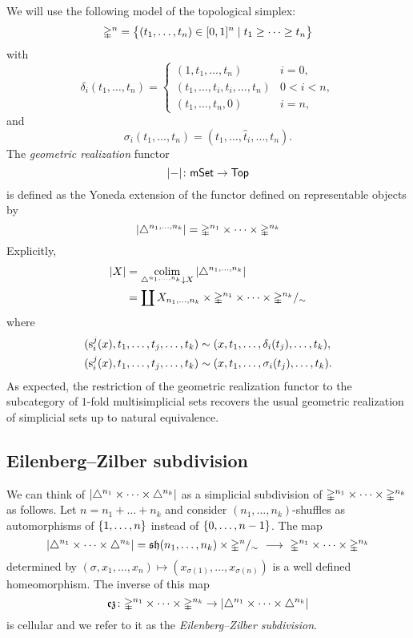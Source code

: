 We will use the following model of the topological simplex:
\[
\mathbb{\Delta}^n = \big\{
(t_1, \dots, t_n) \in [0,1]^n \mid t_1 \geq \dots \geq t_n
\big\}
\]
with
\[
\delta_i(t_1, \dots, t_n) =
\begin{cases}
	(1, t_1, \dots, t_n) & i = 0, \\
	(t_1, \dots, t_i, t_i, \dots, t_n) & 0 < i < n, \\
	(t_1, \dots, t_n, 0) & i = n,
\end{cases}
\]
and
\[
\sigma_i(t_1, \dots, t_n) = (t_1, \dots, \widehat t_i, \dots, t_n).
\]
The \textit{geometric realization} functor
\[
\lvert-\rvert \colon \mathsf{mSet} \to \mathsf{Top}
\]
is defined as the Yoneda extension of the functor defined on representable objects by
\[
\lvert\triangle^{n_1, \dots, n_k}\rvert =
\mathbb{\Delta}^{n_1} \times \dots \times \mathbb{\Delta}^{n_k}
\]
Explicitly,
\begin{align*}
	\bars{X} &=
	\colim_{\cramped{\simplex^{n_1, \dots, n_k} \downarrow X}} \, \bars{\simplex^{n_1, \dots, n_k}} \\ &=
	\coprod X_{n_1,\dots,n_k} \times \gsimplex^{n_1} \times \dots \times \gsimplex^{n_k} /_\sim
\end{align*}
where
\[
\begin{split}
(\operatorname{s}_i^j(x), t_1, \dots, t_j, \dots, t_k) &\sim (x, t_1, \dots, \delta_i(t_j), \dots, t_k), \\
(\operatorname{s}^j_i(x), t_1, \dots, t_j, \dots, t_k) &\sim (x, t_1, \dots, \sigma_i(t_j), \dots, t_k).
\end{split}
\]
As expected, the restriction of the geometric realization functor to the subcategory of $1$-fold multisimplicial sets recovers the usual geometric realization of simplicial sets up to natural equivalence.

\subsection{Eilenberg--Zilber subdivision}

We can think of $\lvert\triangle^{n_1} \times \dots \times \triangle^{n_k}\rvert$ as a simplicial subdivision of $\mathbb{\Delta}^{n_1} \times \dots \times \mathbb{\Delta}^{n_k}$ as follows.
Let $n = n_1 + \dots + n_k$ and consider $(n_1, \dots, n_k)$-shuffles as automorphisms of $\{1, \dots, n\}$ instead of $\{0, \dots, n-1\}$.
The map
\[
\lvert\triangle^{n_1} \times \dots \times \triangle^{n_k}\rvert =
\operatorname{\mathfrak{sh}}(n_1, \dots, n_k) \times \mathbb{\Delta}^n /_\sim \ \longrightarrow \
\mathbb{\Delta}^{n_1} \times \dots \times \mathbb{\Delta}^{n_k}
\]
determined by $(\sigma, x_1, \dots, x_n) \mapsto (x_{\sigma(1)}, \dots, x_{\sigma(n)})$ is a well defined homeomorphism.
The inverse of this map
\[
\operatorname{\mathfrak{ez}} \colon
\mathbb{\Delta}^{n_1} \times \dots \times \mathbb{\Delta}^{n_k} \to
\lvert\triangle^{n_1} \times \dots \times \triangle^{n_k}\rvert
\]
is cellular and we refer to it as the \textit{Eilenberg--Zilber subdivision}.

